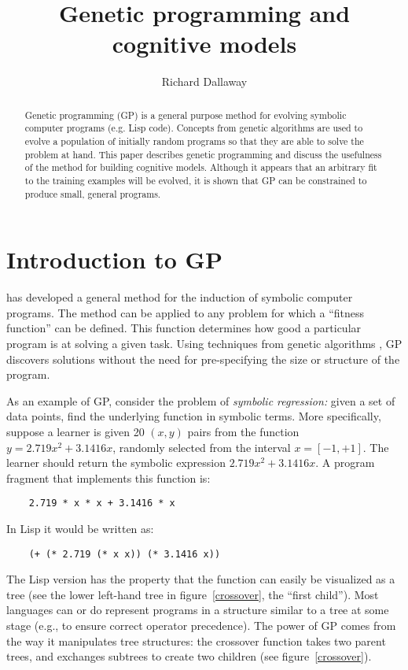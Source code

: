 
\def\refname{References}
\NoCommaBetweenTwoAuthors
{}
\def\BTR{Technical report}




\author{Richard Dallaway}
\title{Genetic programming and cognitive models}

\maketitle

\begin{abstract}
Genetic programming (GP) is a general purpose method for
evolving symbolic computer programs (e.g. Lisp code). Concepts from
genetic algorithms are used to evolve a population of initially random
programs so that they are able to solve the problem at hand.  This paper
describes genetic programming and discuss the usefulness of the method for
building cognitive models.  Although it appears that an
arbitrary fit to the training examples will be evolved, it is shown that GP
can be constrained to produce small, general programs.
\end{abstract}

\section*{Introduction to GP}

 has developed a general method for the induction of symbolic
computer programs.  The method can be applied to any problem for which a
``fitness function'' can be defined.  This function determines how good a
particular program is at solving a given task.  Using techniques from
genetic algorithms \cite{holladap}, GP discovers solutions without the need
for pre-specifying the size or structure of the program.

As an example of GP, consider the problem of {\em symbolic regression:}
given a set of data points, find the underlying function in symbolic terms.
More specifically, suppose a learner is given 20 $(x,y)$ pairs from the
function $y=2.719x^2+3.1416x$, randomly selected from the interval
$x=[-1,+1]$.  The learner should return the symbolic
expression $2.719x^2+3.1416x$. A program fragment that implements this
function is:
\begin{verbatim}
    2.719 * x * x + 3.1416 * x
\end{verbatim}
In Lisp it would be written as:
\begin{verbatim}
    (+ (* 2.719 (* x x)) (* 3.1416 x))
\end{verbatim}
The Lisp version has the property that the function can easily be
visualized as a tree (see the lower left-hand tree in
figure~\ref{crossover}, the ``first child''). Most languages can or do
represent programs in a structure similar to a tree at some stage (e.g., to
ensure correct operator precedence).  The power of GP comes from the way
it manipulates tree structures:  the crossover function takes two parent
trees, and exchanges subtrees to create two children (see
figure~\ref{crossover}).

